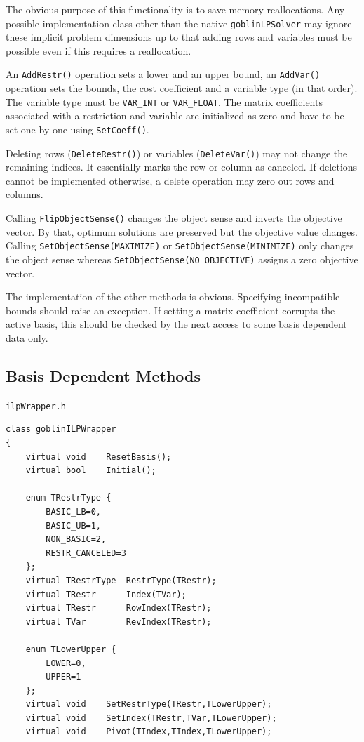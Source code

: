 \documentclass[a4paper,11pt,twoside]{book}
\begin{document}
\begin{multicols}{2}
The obvious purpose of this functionality is to save memory reallocations.
Any possible implementation class other than the native \verb/goblinLPSolver/
may ignore these implicit problem dimensions up to that adding rows
and variables must be possible even if this requires a reallocation.

An \verb/AddRestr()/ operation sets a lower and an upper bound, an
\verb/AddVar()/ operation sets the bounds, the cost coefficient and
a variable type (in that order). The variable type must be \verb/VAR_INT/
or \verb/VAR_FLOAT/. The matrix coefficients associated with a restriction and
variable are initialized as zero and have to be set one by one using
\verb/SetCoeff()/.

Deleting rows (\verb/DeleteRestr()/) or variables (\verb/DeleteVar()/) may not
change the remaining indices. It essentially marks the row or column as
canceled. If deletions cannot be implemented otherwise, a delete operation may
zero out rows and columns.

Calling \verb/FlipObjectSense()/ changes the object sense and inverts the
objective vector. By that, optimum solutions are preserved but the objective
value changes. Calling \verb/SetObjectSense(MAXIMIZE)/ or
\verb/SetObjectSense(MINIMIZE)/ only changes the object sense whereas
\verb/SetObjectSense(NO_OBJECTIVE)/ assigns a zero objective vector.

The implementation of the other methods is obvious. Specifying incompatible
bounds should raise an exception. If setting a matrix coefficient corrupts
the active basis, this should be checked by the next access to some basis
dependent data only.


\newpage
\subsection{Basis Dependent Methods}
\myinclude\verb/ilpWrapper.h/
\begin{mymethods}
\begin{verbatim}
class goblinILPWrapper
{
    virtual void    ResetBasis();
    virtual bool    Initial();
    
    enum TRestrType {
        BASIC_LB=0,
        BASIC_UB=1,
        NON_BASIC=2,
        RESTR_CANCELED=3
    };
    virtual TRestrType  RestrType(TRestr);
    virtual TRestr      Index(TVar);
    virtual TRestr      RowIndex(TRestr);
    virtual TVar        RevIndex(TRestr);

    enum TLowerUpper {
        LOWER=0,
        UPPER=1
    };
    virtual void    SetRestrType(TRestr,TLowerUpper);
    virtual void    SetIndex(TRestr,TVar,TLowerUpper);
    virtual void    Pivot(TIndex,TIndex,TLowerUpper);


\end{verbatim}
\end{mymethods}
\end{multicols}
\end{document}
